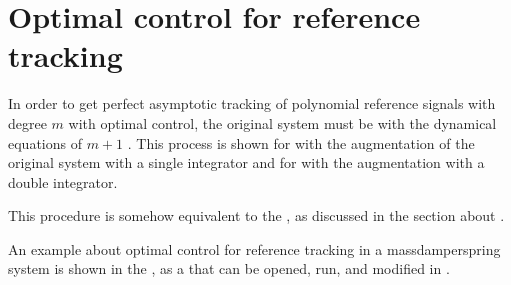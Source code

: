 \documentclass[letterpaper,10pt,english]{jupyterBook}
\begin{document}
\section{Optimal control for reference tracking}
\label{\detokenize{ch/control/optimal-control-ref-tracking:optimal-control-for-reference-tracking}}\label{\detokenize{ch/control/optimal-control-ref-tracking:control-optimal-ref-tracking}}\label{\detokenize{ch/control/optimal-control-ref-tracking::doc}}


\sphinxAtStartPar
In order to get perfect asymptotic tracking of polynomial reference signals with degree \(m\) with optimal control, the original system must be  with the dynamical equations of \(m+1\) . This process is shown for {\hyperref[\detokenize{ch/control/optimal-control-ref-tracking:control-optimal-ref-tracking-step}]{}} with the augmentation of the original system with a single integrator and for {\hyperref[\detokenize{ch/control/optimal-control-ref-tracking:control-optimal-ref-tracking-ramp}]{}} with the augmentation with a double integrator.

\sphinxAtStartPar
This procedure is somehow equivalent to the , as discussed in the section about {\hyperref[\detokenize{ch/control/closed-loop-requirements-performance-siso-ref-tracking:control-closed-loop-requirements-performance-siso-ref-tracking}]{}}.

\sphinxAtStartPar
An example about optimal control for reference tracking in a mass\sphinxhyphen{}damper\sphinxhyphen{}spring system is shown in the {\hyperref[\detokenize{ch/control/optimal-control-ref-tracking-example:control-optimal-ref-tracking-example}]{}}, as a  that can be opened, run, and modified in .
\end{document}
